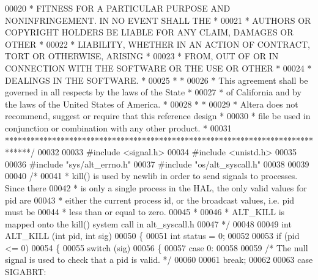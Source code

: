 \begin{DoxyCode}
00020 \textcolor{comment}{* FITNESS FOR A PARTICULAR PURPOSE AND NONINFRINGEMENT. IN NO EVENT SHALL THE *}
00021 \textcolor{comment}{* AUTHORS OR COPYRIGHT HOLDERS BE LIABLE FOR ANY CLAIM, DAMAGES OR OTHER      *}
00022 \textcolor{comment}{* LIABILITY, WHETHER IN AN ACTION OF CONTRACT, TORT OR OTHERWISE, ARISING     *}
00023 \textcolor{comment}{* FROM, OUT OF OR IN CONNECTION WITH THE SOFTWARE OR THE USE OR OTHER         *}
00024 \textcolor{comment}{* DEALINGS IN THE SOFTWARE.                                                   *}
00025 \textcolor{comment}{*                                                                             *}
00026 \textcolor{comment}{* This agreement shall be governed in all respects by the laws of the State   *}
00027 \textcolor{comment}{* of California and by the laws of the United States of America.              *}
00028 \textcolor{comment}{*                                                                             *}
00029 \textcolor{comment}{* Altera does not recommend, suggest or require that this reference design    *}
00030 \textcolor{comment}{* file be used in conjunction or combination with any other product.          *}
00031 \textcolor{comment}{******************************************************************************/}
00032 
00033 \textcolor{preprocessor}{#include <signal.h>}
00034 \textcolor{preprocessor}{#include <unistd.h>}
00035 
00036 \textcolor{preprocessor}{#include "sys/alt_errno.h"}
00037 \textcolor{preprocessor}{#include "os/alt_syscall.h"}
00038 
00039 
00040 \textcolor{comment}{/*}
00041 \textcolor{comment}{ * kill() is used by newlib in order to send signals to processes. Since there}
00042 \textcolor{comment}{ * is only a single process in the HAL, the only valid values for pid are }
00043 \textcolor{comment}{ * either the current process id, or the broadcast values, i.e. pid must be}
00044 \textcolor{comment}{ * less than or equal to zero. }
00045 \textcolor{comment}{ *}
00046 \textcolor{comment}{ * ALT\_KILL is mapped onto the kill() system call in alt\_syscall.h}
00047 \textcolor{comment}{ */}
00048 
00049 \textcolor{keywordtype}{int} ALT_KILL (\textcolor{keywordtype}{int} pid, \textcolor{keywordtype}{int} sig)
00050 \{
00051   \textcolor{keywordtype}{int} status = 0;
00052 
00053   \textcolor{keywordflow}{if} (pid <= 0)
00054   \{
00055     \textcolor{keywordflow}{switch} (sig)
00056     \{
00057     \textcolor{keywordflow}{case} 0:
00058 
00059       \textcolor{comment}{/* The null signal is used to check that a pid is valid. */}
00060 
00061       \textcolor{keywordflow}{break};
00062 
00063     \textcolor{keywordflow}{case} SIGABRT:

\end{DoxyCode}
